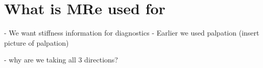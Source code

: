 \documentclass[a4paper,10pt]{article}
\title{}
\author{}
\begin{document}
\maketitle

\begin{abstract}

\end{abstract}

\section{What is MRe used for}


- We want stiffness information for diagnostics
- Earlier we used palpation (insert picture of palpation)

- why are we taking all 3 directions?
\end{document}
